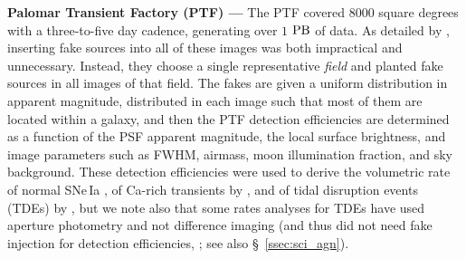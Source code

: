 \documentclass[DM,lsstdraft,toc]{lsstdoc}
\begin{document}
{\bf Palomar Transient Factory (PTF) ---} The PTF covered $8000$ square degrees with a three-to-five day cadence, generating over $1$ $\rm PB$ of data. As detailed by \cite{2017ApJS..230....4F}, inserting fake sources into all of these images was both impractical and unnecessary. Instead, they choose a single representative {\it field} and planted fake sources in all images of that field. The fakes are given a uniform distribution in apparent magnitude, distributed in each image such that most of them are located within a galaxy, and then the PTF detection efficiencies are determined as a function of the PSF apparent magnitude, the local surface brightness, and image parameters such as FWHM, airmass, moon illumination fraction, and sky background. These detection efficiencies were used to derive the volumetric rate of normal SNe\,Ia \citep{2019MNRAS.tmp..772F}, of Ca-rich transients by \cite{2018ApJ...858...50F}, and of tidal disruption events (TDEs) by \cite{2018ApJS..238...15H}, but we note also that some rates analyses for TDEs have used aperture photometry and not difference imaging (and thus did not need fake injection for detection efficiencies, \citealt{2016MNRAS.455.2918H}; see also \S~\ref{ssec:sci_agn}).  
\end{document}
